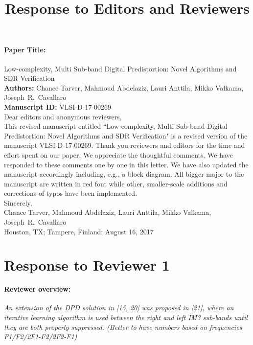 \documentclass[]{article}
\title{Response to Editors and Reviewers}
\date{\vspace{-5ex}}
\author{\vspace{-5ex}}
\begin{document}
\maketitle

\paragraph{Paper Title:} Low-complexity, Multi Sub-band Digital Predistortion: Novel Algorithms and SDR Verification \\
\textbf{Authors:} Chance Tarver, Mahmoud Abdelaziz, Lauri Anttila, Mikko Valkama, Joseph~R.~Cavallaro\\
\textbf{Manuscript ID:} VLSI-D-17-00269\\

Dear editors and anonymous reviewers,\\


This revised manuscript entitled ``Low-complexity, Multi Sub-band Digital Predistortion: Novel Algorithms and SDR Verification" is a revised version of the manuscript VLSI-D-17-00269. 
Thank you reviewers and editors for the time and effort spent on our paper. We appreciate the thoughtful comments.
We have responded to these comments one by one in this letter. 
We have also updated the manuscript accordingly including, e.g., a
block diagram. 
All bigger major to the manuscript are written in {\color{red} red font} while other, smaller-scale additions and corrections of typos have been implemented.\\

Sincerely,\\

Chance Tarver, Mahmoud Abdelaziz, Lauri Anttila, Mikko Valkama, Joseph~R.~Cavallaro\\

Houston, TX; Tampere, Finland; August 16, 2017


\newpage
\section{Response to Reviewer 1}
\paragraph{Reviewer overview:} \textit{An extension of the DPD solution in [15, 20] was proposed in [21], where an iterative learning algorithm is used between the right and left IM3 sub-bands until they are both properly suppressed. (Better to have numbers based on frequencies F1/F2/2F1-F2/2F2-F1)}
\end{document}
